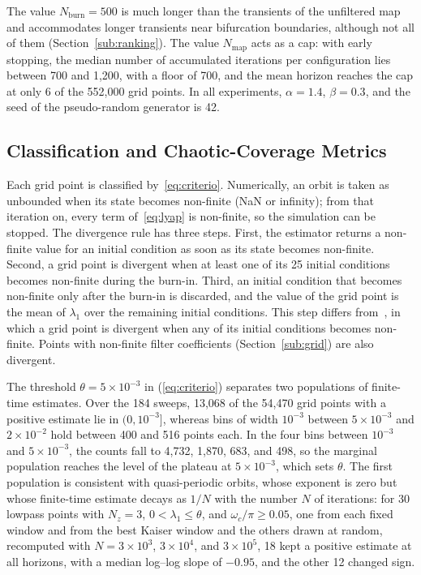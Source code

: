 \documentclass[journal]{IEEEtran}
\begin{document}
The value $N_{\text{burn}}=500$ is much longer than the transients of the
unfiltered map and accommodates longer transients near bifurcation
boundaries, although not all of them (Section~\ref{sub:ranking}). The value $N_\text{map}$ acts as a cap: with early stopping, the median number
of accumulated iterations per configuration lies between 700 and 1,200, with a
floor of 700, and the mean horizon reaches the cap at only 6 of the 552,000 grid
points. In all experiments,
$\alpha=1.4$, $\beta=0.3$,
and the seed of the pseudo-random generator is 42.

\subsection{Classification and Chaotic-Coverage Metrics}\label{sub:metrics}
Each grid point is classified by~\eqref{eq:criterio}. Numerically, an orbit is
taken as unbounded when its state becomes non-finite (NaN or infinity); from
that iteration on, every term of~\eqref{eq:lyap} is non-finite, so the
simulation can be stopped. The divergence rule has three steps. First, the
estimator returns a non-finite value for an initial condition as soon as its
state becomes non-finite. Second, a grid point is divergent when at least one
of its 25 initial conditions becomes non-finite during the burn-in. Third, an
initial condition that becomes non-finite only after the burn-in is
discarded, and the value of the grid point is the mean of $\lambda_1$ over the
remaining initial conditions. This step differs from~\cite{BorgesCNSNS2024}, in
which a grid point is divergent when any of its initial conditions becomes
non-finite. Points with non-finite filter coefficients
(Section~\ref{sub:grid}) are also divergent.




The threshold $\theta=5\times10^{-3}$ in (\ref{eq:criterio}) separates two
populations of finite-time estimates. Over the 184 sweeps, 13{,}068 of
the 54{,}470 grid points with a positive estimate lie in $(0,10^{-3}]$,
whereas bins of width $10^{-3}$ between $5\times10^{-3}$ and $2\times10^{-2}$
hold between 400 and 516 points each. In the four bins between $10^{-3}$ and
$5\times10^{-3}$, the counts fall to 4,732, 1,870, 683, and 498, so the
marginal population reaches the level of the plateau at $5\times10^{-3}$, which
sets $\theta$. The first population
is consistent with quasi-periodic orbits, whose exponent is zero but whose
finite-time estimate decays as $1/N$ with the number $N$ of iterations: for 30
lowpass points with $N_z=3$, $0<\lambda_1\le\theta$, and
$\omega_c/\pi\ge0.05$, one from each fixed window and from the best Kaiser
window and the others drawn at random, recomputed with
$N=3\times10^3$, $3\times10^4$, and $3\times10^5$, 18 kept a positive estimate
at all horizons, with a median log--log slope of $-0.95$, and the other 12
changed sign.
\end{document}

